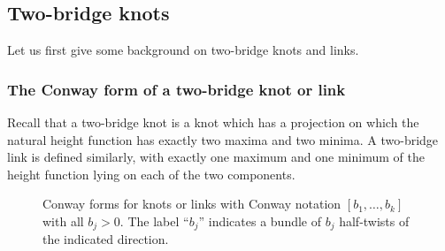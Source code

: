 \documentclass[11pt]{article}
\theoremstyle{plain} \newtheorem{thm}{Theorem}[subsection]
\theoremstyle{plain} \newtheorem{cor}[thm]{Corollary}
\theoremstyle{plain} \newtheorem{prop}[thm]{Proposition}
\theoremstyle{plain} \newtheorem{conj}[thm]{Conjecture}
\theoremstyle{plain} \newtheorem{lem}[thm]{Lemma}
\theoremstyle{definition} \newtheorem{df}[thm]{Definition}
\theoremstyle{remark} \newtheorem{rmk}[thm]{Remark}
\theoremstyle{remark} \newtheorem{obs}[thm]{Observation}
\numberwithin{equation}{section}
\begin{document}
\subsection{Two-bridge knots}\label{sec2bridge}

Let us first give some background on two-bridge knots and links.

\subsubsection{The Conway form of a two-bridge knot or link}

Recall that a two-bridge knot is a knot which has a projection on which the natural height function has exactly two maxima and two minima.  A two-bridge link is defined similarly, with exactly one maximum and one minimum of the height function lying on each of the two components.

\begin{figure}[h]
\centering
\begin{minipage}[c]{.55\linewidth}
\quad
{}
\end{minipage}
\begin{minipage}[c]{.40\linewidth}
\caption[Conway forms for knots or links]{Conway forms for knots or links with Conway notation $[b_{1}, \ldots, b_{k}]$ with all $b_j > 0$.  The label ``$b_{j}$'' indicates a bundle of $b_{j}$ half-twists of the indicated direction.}
\label{fig:conway}
\end{minipage}
\end{figure}
\end{document}
